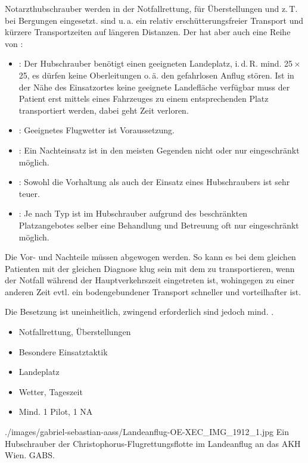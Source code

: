 {%
%
%
%
Notarzthubschrauber werden in der Notfallrettung, für
Überstellungen und z.\,T. bei Bergungen eingesetzt.
 sind u.\,a. ein relativ erschütterungsfreier
Transport und kürzere Transportzeiten auf längeren Distanzen.
Der  hat aber auch eine Reihe von :

\begin{itemize}
  \item {}: Der Hubschrauber benötigt einen
  geeigneten Landeplatz, i.\,d.\,R. mind.
  25\,$\times$\,25\Meter*, es dürfen keine Oberleitungen
  o.\,ä. den gefahrlosen Anflug stören. Ist in der Nähe des
  Einsatzortes keine geeignete Landefläche verfügbar muss der
  Patient erst mittels eines Fahrzeuges zu einem
  entsprechenden Platz transportiert werden, dabei geht Zeit
  verloren.
  \item {}: Geeignetes Flugwetter ist
  Voraussetzung.
  \item {}: Ein Nachteinsatz ist in den
  meisten Gegenden nicht oder nur
  eingeschränkt möglich.
  \item {}: Sowohl die Vorhaltung als auch der
  Einsatz eines Hubschraubers ist sehr teuer.
  \item {}: Je nach Typ ist im Hubschrauber aufgrund
  des beschränkten Platzangebotes selber
eine Behandlung und Betreuung oft nur eingeschränkt möglich.
\end{itemize}

Die Vor- und Nachteile müssen abgewogen werden. So kann es
bei dem gleichen Patienten mit der gleichen Diagnose klug
sein mit dem  zu transportieren, wenn der Notfall
während der Hauptverkehrszeit eingetreten ist, wohingegen zu
einer anderen Zeit evtl. ein bodengebundener Transport
schneller und vorteilhafter ist.



Die Besetzung ist uneinheitlich, zwingend erforderlich sind
jedoch mind. .

}{
\begin{itemize}
  \item Notfallrettung, Überstellungen 
  \item Besondere Einsatztaktik
  \item Landeplatz
  \item Wetter, Tageszeit
  \item Mind. 1 Pilot, 1 NA
\end{itemize}
}
{./images/gabriel-sebastian-aass/Landeanflug-OE-XEC_IMG_1912_1.jpg}
{Ein Hubschrauber der Christophorus-Flugrettungsflotte im Landeanflug an das AKH
Wien.} {GABS.}

